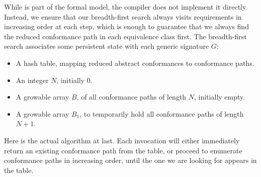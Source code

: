 \documentclass[../generics]{subfiles}
\begin{document}
While  is part of the formal model, the compiler does not implement it directly. Instead, we ensure that our breadth-first search always visits requirements in increasing order at each step, which is enough to guarantee that we always find the reduced conformance path in each equivalence class first. The breadth-first search associates some persistent state with each generic signature $G$:
\begin{itemize}
\item A hash table, mapping reduced abstract conformances to conformance paths.
\item An integer $N$, initially 0.
\item A growable array $B$, of all conformance paths of length $N$, initially empty.
\item A growable array $B_1$, to temporarily hold all conformance paths of length $N+1$.
\end{itemize}

Here is the actual algorithm at last. Each invocation will either immediately return an existing conformance path from the table, or proceed to enumerate conformance paths in increasing order, until the one we are looking for appears in the table.
\end{document}
